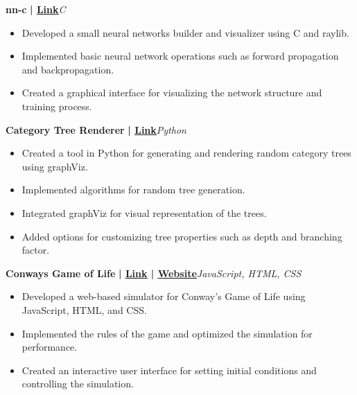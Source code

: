 \documentclass[a4paper]{article}
\begin{document}
          \vspace*{3mm}
      {\textbf{nn-c}}\textbf{ | \href{https://github.com/syedhuzaif199/nn-c}{\underline{Link}}}\hfill{\sl C}\\
          \vspace{-1mm}
\begin{itemize} \itemsep -3pt
\item Developed a small neural networks builder and visualizer using C and raylib.
\item Implemented basic neural network operations such as forward propagation and backpropagation.
\item Created a graphical interface for visualizing the network structure and training process.
\end{itemize}
          \vspace*{3mm}
      {\textbf{Category Tree Renderer}}\textbf{ | \href{https://github.com/syedhuzaif199/category-tree}{\underline{Link}}}\hfill{\sl Python}\\
          \vspace{-1mm}
\begin{itemize} \itemsep -3pt
\item Created a tool in Python for generating and rendering random category trees using graphViz.
\item Implemented algorithms for random tree generation.
\item Integrated graphViz for visual representation of the trees.
\item Added options for customizing tree properties such as depth and branching factor.
\end{itemize}
          \vspace*{3mm}
      {\textbf{Conway\textquotesingle{}s Game of Life}}\textbf{ | \href{https://github.com/syedhuzaif199/game-of-life}{\underline{Link}} | \href{https://syedhuzaif199.github.io/game-of-life}{\underline{Website}}}\hfill{\sl JavaScript, HTML, CSS}\\
          \vspace{-1mm}
\begin{itemize} \itemsep -3pt
\item Developed a web-based simulator for Conway's Game of Life using JavaScript, HTML, and CSS.
\item Implemented the rules of the game and optimized the simulation for performance.
\item Created an interactive user interface for setting initial conditions and controlling the simulation.
\end{itemize}
\end{document}
